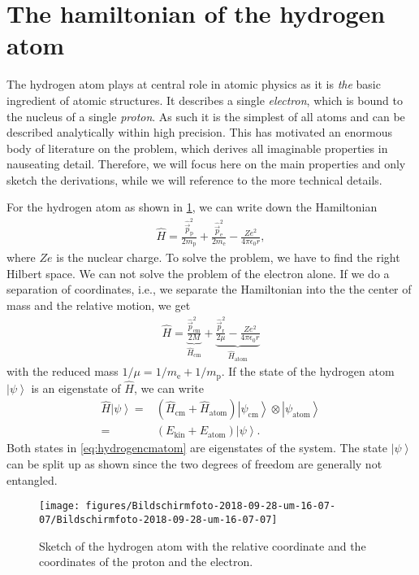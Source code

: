 \documentclass[10pt]{article}
\newcommand{\ket}[1]{\ensuremath{\left|#1\right\rangle}}
\begin{document}
\section{The hamiltonian of the hydrogen atom}

The hydrogen atom plays at central role in atomic physics as it is \textit{the} basic ingredient of atomic structures. It describes a single \textit{electron}, which is bound to the nucleus of a single \textit{proton}. As such it is the simplest of all atoms and can be described analytically within high precision. This has motivated an enormous body of literature on the problem, which derives all imaginable properties in nauseating detail. Therefore, we will focus here on the main properties and only sketch the derivations, while we will reference to the more technical details. 

For the hydrogen atom as shown in \ref{261310}, we can write down the Hamiltonian 
\begin{align}
\hat{H}=\frac{{{\hat{\vec{p}}}^2_\text{p}}}{2m_\text{p}} + \frac{{\hat{\vec{p}}}^2_\text{e}}{2m_\text{e}} - \frac{Ze^2}{4\pi\epsilon_0 r},
\end{align}
where $Ze$ is the nuclear charge. To solve the problem, we have to find the right Hilbert space. We can not solve the problem of the electron alone. If we do a separation of coordinates, i.e., we separate the Hamiltonian into the the center of mass and the relative motion, we get
\begin{align}
\hat{H} = \underbrace{\frac{{\hat{\vec{p}}}^2_{\textrm{cm}}}{2M}}_{\hat{H}_{\textrm{cm}}} + \underbrace{\frac{{\hat{\vec{p}}}^2_\text{r}}{2\mu}- \frac{Ze^2}{4\pi\epsilon_0r}}_{\hat{H}_{\text{atom}}} \label{eq:hydrogencmatomsplit}
\end{align}
with the reduced mass $1/\mu=1/m_\text{e}+1/m_\text{p}$.
If the state of the hydrogen atom $\ket{\psi}$ is an eigenstate of $\hat{H}$, we can write
\begin{align}
\hat{H}\ket{\psi}=&\left( \hat{H}_\textrm{cm}+\hat{H}_{\text{atom}} \right)\ket{\psi_\textrm{cm}}\otimes \ket{\psi_\text{atom}} \label{eq:hydrogencmatom}\\
=& \left( E_{\text{kin}} + E_\text{atom} \right) \ket{\psi}.
\end{align}
Both states in \eqref{eq:hydrogencmatom} are eigenstates of the system. %
The state $\ket{\psi}$ can be split up as shown since the two degrees of freedom are generally not entangled.%
\begin{figure}[h!]
\begin{center}
\texttt{[image: figures/Bildschirmfoto-2018-09-28-um-16-07-07/Bildschirmfoto-2018-09-28-um-16-07-07]}
\caption{{Sketch of the hydrogen atom with the relative coordinate and the
coordinates of the proton and the electron.
{\label{261310}}%
}}
\end{center}
\end{figure}
\end{document}
